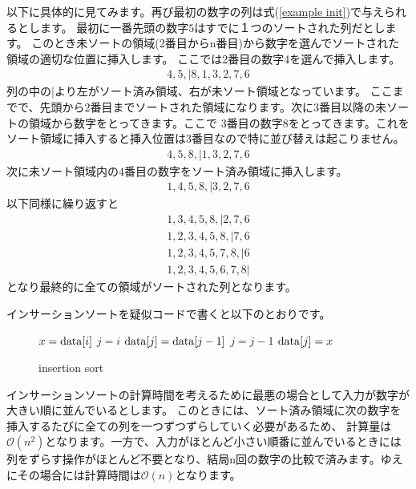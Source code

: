 \documentclass[dvipdfmx,pic,eepic,ecltree]{jarticle}
\begin{document}
以下に具体的に見てみます。再び最初の数字の列は式(\ref{example init})で与えられるとします。
最初に一番先頭の数字$5$はすでに１つのソートされた列だとします。
このとき未ソートの領域(2番目からn番目)から数字を選んでソートされた領域の適切な位置に挿入します。
ここでは2番目の数字4を選んで挿入します。
\begin{eqnarray}
4, 5,| 8, 1, 3, 2, 7, 6
\end{eqnarray}
列の中の$|$より左がソート済み領域、右が未ソート領域となっています。
ここまでで、先頭から2番目までソートされた領域になります。次に3番目以降の未ソートの領域から数字をとってきます。ここで
3番目の数字8をとってきます。これをソート領域に挿入すると挿入位置は3番目なので特に並び替えは起こりません。
\begin{eqnarray}
4, 5, 8,| 1, 3, 2, 7, 6
\end{eqnarray}
次に未ソート領域内の4番目の数字をソート済み領域に挿入します。
\begin{eqnarray}
1, 4, 5, 8,| 3, 2, 7, 6
\end{eqnarray}
以下同様に繰り返すと
\begin{eqnarray}
1, 3, 4, 5, 8,| 2, 7, 6\\
1, 2, 3, 4, 5, 8,| 7, 6\\
1, 2, 3, 4, 5, 7, 8,| 6\\
1, 2, 3, 4, 5, 6, 7, 8|
\end{eqnarray}
となり最終的に全ての領域がソートされた列となります。

インサーションソートを疑似コードで書くと以下のとおりです。
\begin{figure}[H]
\begin{algorithm}[H]
	\caption{insertion sort}
	\label{insertion sort}
	\begin{algorithmic}[1]  
	\STATE $x={\rm data}[i]$
	\STATE $j=i$
    	\STATE ${\rm data}[j] = {\rm data}[j-1]$
	\STATE $j = j-1$
	\ENDWHILE
	\STATE ${\rm data}[j] = x$
	\ENDFOR
	\end{algorithmic}
\end{algorithm}
\end{figure}
インサーションソートの計算時間を考えるために最悪の場合として入力が数字が大きい順に並んでいるとします。
このときには、ソート済み領域に次の数字を挿入するたびに全ての列を一つずつずらしていく必要があるため、
計算量は$\mathcal{O}(n^{2})$となります。一方で、入力がほとんど小さい順番に並んでいるときには
列をずらす操作がほとんど不要となり、結局n回の数字の比較で済みます。ゆえにその場合には計算時間は$\mathcal{O}(n)$となります。
\end{document}
